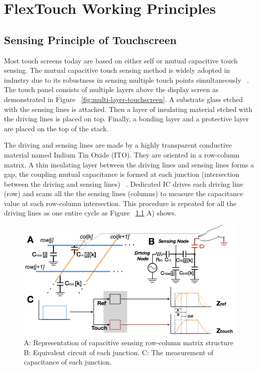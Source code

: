 \chapter{FlexTouch Working Principles}

\section{Sensing Principle of Touchscreen}
Most touch screens today are based on either self or mutual capacitive touch sensing. The mutual capacitive touch sensing method is widely adopted in industry due to its robustness in sensing multiple touch points simultaneously ~\cite{ye2015high}. The touch panel consists of multiple layers above the display screen as demonstrated in Figure ~\ref{fig:multi-layer-touchscreen}. A substrate glass etched with the sensing lines is attached. Then a layer of insulating material etched with the driving lines is placed on top. Finally, a bonding layer and a protective layer are placed on the top of the stack. 

The driving and sensing lines are made by a highly transparent conductive material named Indium Tin Oxide (ITO). They are oriented in a row-column matrix. A thin insulating layer between the driving lines and sensing lines forms a gap, the coupling mutual capacitance is formed at each junction (intersection between the driving and sensing lines) ~\cite{barrett2010projected}. Dedicated IC drives each driving line (row) and scans all the the sensing lines (columns) to measure the capacitance value at each row-column intersection. This procedure is repeated for all the driving lines as one entire cycle as Figure ~\ref{fig:touchscreen-principle-circuit} A) shows. 

\begin{figure}[h]
\centering
  \includegraphics[width=0.95\columnwidth]{figures/touchscreen-principle-circuit.png}
  \caption{A: Representation of capacitive sensing row-column matrix structure B: Equivalent circuit of each junction. C: The measurement of capacitance of each junction.}
  \label{fig:touchscreen-principle-circuit}
\end{figure}

